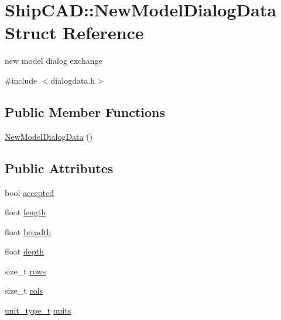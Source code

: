 \hypertarget{structShipCAD_1_1NewModelDialogData}{}\section{Ship\+C\+AD\+:\+:New\+Model\+Dialog\+Data Struct Reference}
\label{structShipCAD_1_1NewModelDialogData}


new model dialog exchange  




{\ttfamily \#include $<$dialogdata.\+h$>$}

\subsection*{Public Member Functions}
\begin{DoxyCompactItemize}
\item 
\hyperlink{structShipCAD_1_1NewModelDialogData_ad7e8e3516c7e2bdd77174785e13e560f}{New\+Model\+Dialog\+Data} ()
\end{DoxyCompactItemize}
\subsection*{Public Attributes}
\begin{DoxyCompactItemize}
\item 
bool \hyperlink{structShipCAD_1_1NewModelDialogData_aff4f1f738dfe7457456bd1e2d0e4f37e}{accepted}
\item 
float \hyperlink{structShipCAD_1_1NewModelDialogData_ad81a20ab469df5a0f65149f967415d31}{length}
\item 
float \hyperlink{structShipCAD_1_1NewModelDialogData_af2d41edf92aa7fa317cc956801aeab50}{breadth}
\item 
float \hyperlink{structShipCAD_1_1NewModelDialogData_a6941e9fd4fd42257c0b05c6076aadc2a}{depth}
\item 
size\+\_\+t \hyperlink{structShipCAD_1_1NewModelDialogData_aa1624f2018fd39dbbe80bc10e70efa8b}{rows}
\item 
size\+\_\+t \hyperlink{structShipCAD_1_1NewModelDialogData_ad0fc3e908a10e878c747fac2fe71b67b}{cols}
\item 
\hyperlink{namespaceShipCAD_ac6a7a28b4b063771afae92decb602da5}{unit\+\_\+type\+\_\+t} \hyperlink{structShipCAD_1_1NewModelDialogData_a8ff4b02ff5c3ce20c0b0d3bdade551a7}{units}
\end{DoxyCompactItemize}



